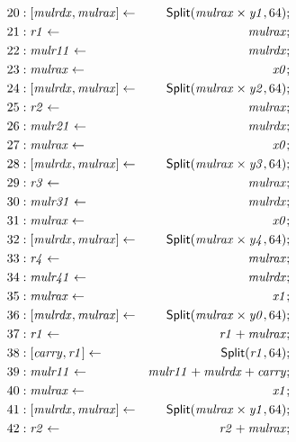 {\begin{multicols}{2}
\begin{align*}
20 &: \concat{\mathit{mulrdx}}{\mathit{mulrax}} \leftarrow & \dslcode{Split}(\mathit{mulrax} \times \mathit{y1}, 64); \\
21 &: \mathit{r1} \leftarrow & \mathit{mulrax}; \\
22 &: \mathit{mulr11} \leftarrow & \mathit{mulrdx}; \\
23 &: \mathit{mulrax} \leftarrow & \mathit{x0}; \\
24 &: \concat{\mathit{mulrdx}}{\mathit{mulrax}} \leftarrow & \dslcode{Split}(\mathit{mulrax} \times \mathit{y2}, 64); \\
25 &: \mathit{r2} \leftarrow & \mathit{mulrax}; \\
26 &: \mathit{mulr21} \leftarrow & \mathit{mulrdx}; \\
27 &: \mathit{mulrax} \leftarrow & \mathit{x0}; \\
28 &: \concat{\mathit{mulrdx}}{\mathit{mulrax}} \leftarrow & \dslcode{Split}(\mathit{mulrax} \times \mathit{y3}, 64); \\
29 &: \mathit{r3} \leftarrow & \mathit{mulrax}; \\
30 &: \mathit{mulr31} \leftarrow & \mathit{mulrdx}; \\
31 &: \mathit{mulrax} \leftarrow & \mathit{x0}; \\
32 &: \concat{\mathit{mulrdx}}{\mathit{mulrax}} \leftarrow & \dslcode{Split}(\mathit{mulrax} \times \mathit{y4}, 64); \\
33 &: \mathit{r4} \leftarrow & \mathit{mulrax}; \\
34 &: \mathit{mulr41} \leftarrow & \mathit{mulrdx}; \\
35 &: \mathit{mulrax} \leftarrow & \mathit{x1}; \\
36 &: \concat{\mathit{mulrdx}}{\mathit{mulrax}} \leftarrow & \dslcode{Split}(\mathit{mulrax} \times \mathit{y0}, 64); \\
37 &: \mathit{r1} \leftarrow & \mathit{r1} + \mathit{mulrax}; \\
38 &: \concat{\mathit{carry}}{\mathit{r1}} \leftarrow & \dslcode{Split}(\mathit{r1}, 64); \\
39 &: \mathit{mulr11} \leftarrow & \mathit{mulr11} + \mathit{mulrdx} + \mathit{carry}; \\
40 &: \mathit{mulrax} \leftarrow & \mathit{x1}; \\
41 &: \concat{\mathit{mulrdx}}{\mathit{mulrax}} \leftarrow & \dslcode{Split}(\mathit{mulrax} \times \mathit{y1}, 64); \\
42 &: \mathit{r2} \leftarrow & \mathit{r2} + \mathit{mulrax}; \\

\end{align*}
\end{multicols}}
